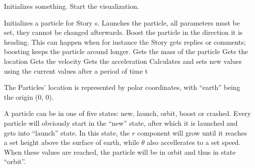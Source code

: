 
\begin{classmetadata}
\end{classmetadata}

\begin{interface}
    {Initializes something.}
    {Start the visualization.}
    {}
\end{interface}




\begin{classmetadata}
\end{classmetadata}

\begin{interface}
    {Initializes a particle for Story s.}
    {Launches the particle, all parameters must be set, they cannot be changed
      afterwards.}
    {Boost the particle in the direction it is heading. This can happen when
      for instance the Story gets replies or comments; boosting keeps the
      particle around longer.}
    {Gets the mass of the particle}
    {Gets the location}
    {Gets the velocity}
    {Gets the acceleration}
    {Calculates and sets new values using the current values after a period of
      time t}
\end{interface}

The Particles' location is represented by polar coordinates, with ``earth''
being the origin (0, 0).

A particle can be in one of five states: new, launch, orbit, boost or crashed.
Every particle will obviously start in the ``new'' state, after which it is
launched and gets into ``launch'' state. In this state, the $r$ component will
grow until it reaches a set height above the surface of earth, while $\theta$
also accellerates to a set speed. When these values are reached, the particle
will be in orbit and thus in state ``orbit''.

